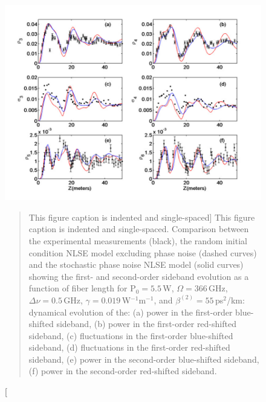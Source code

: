\begin{figure}
\begin{center}
\includegraphics[width=5in]{nlsez55phaseornot.pdf}
\end{center}
\renewcommand{\baselinestretch}{1}
\small\normalsize
\begin{quote}
\caption
[This figure caption is indented and single-spaced]
{This figure caption is indented and single-spaced.  Comparison between the experimental measurements \cite{hart1} (black), the random initial condition NLSE model excluding phase noise (dashed curves) and the stochastic phase noise NLSE model (solid curves) showing the first- and second-order sideband evolution as a function of fiber length for P$_{0} = 5.5$\,W, $\Omega = 366$\,GHz, $\Delta\nu = 0.5$\,GHz, $\gamma = 0.019$\,W$^{-1}$m$^{-1}$, and $\beta^{(2)} = 55$\,ps$^2$/km: dynamical evolution of the: (a) power in the first-order blue-shifted sideband, (b) power in the first-order red-shifted sideband, (c) fluctuations in the first-order blue-shifted sideband, (d) fluctuations in the first-order red-shifted sideband, (e) power in the second-order blue-shifted sideband, (f) power in the second-order red-shifted sideband.}
\label{figA.7}
\end{quote}
\end{figure}
\renewcommand{\baselinestretch}{2}
\small\normalsize

